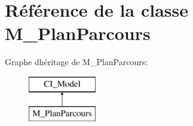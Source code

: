 \hypertarget{class_m___plan_parcours}{}\section{Référence de la classe M\+\_\+\+Plan\+Parcours}
\label{class_m___plan_parcours}
Graphe d\textquotesingle{}héritage de M\+\_\+\+Plan\+Parcours\+:\begin{figure}[H]
\begin{center}
\leavevmode
\includegraphics[height=2.000000cm]{class_m___plan_parcours}
\end{center}
\end{figure}
